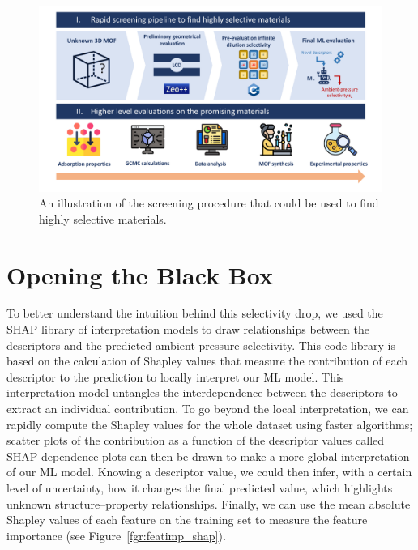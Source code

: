 \documentclass[main]{subfiles}
\begin{document}
\begin{figure}[ht]
\centering
  \includegraphics[width=0.99\linewidth]{figures/4-ml/main/pipeline.pdf}
  \caption{An illustration of the screening procedure that could be used to find highly selective materials.}\label{fgr:pipeline}
\end{figure}

\section{Opening the Black Box}

To better understand the intuition behind this selectivity drop, we used the SHAP\autocite{SHAP,molnar2020interpretable} library of interpretation models to draw relationships between the descriptors and the predicted ambient-pressure selectivity. This code library is based on the calculation of Shapley values\autocite{shapley1953value} that measure the contribution of each descriptor to the prediction to locally interpret our ML model. This interpretation model untangles the interdependence between the descriptors to extract an individual contribution. To go beyond the local interpretation, we can rapidly compute the Shapley values for the whole dataset using faster algorithms;\autocite{SHAP} scatter plots of the contribution as a function of the descriptor values called SHAP dependence plots can then be drawn to make a more global interpretation of our ML model. Knowing a descriptor value, we could then infer, with a certain level of uncertainty, how it changes the final predicted value, which highlights unknown structure--property relationships. Finally, we can use the mean absolute Shapley values of each feature on the training set to measure the feature importance (see Figure~\ref{fgr:featimp_shap}).
\end{document}
